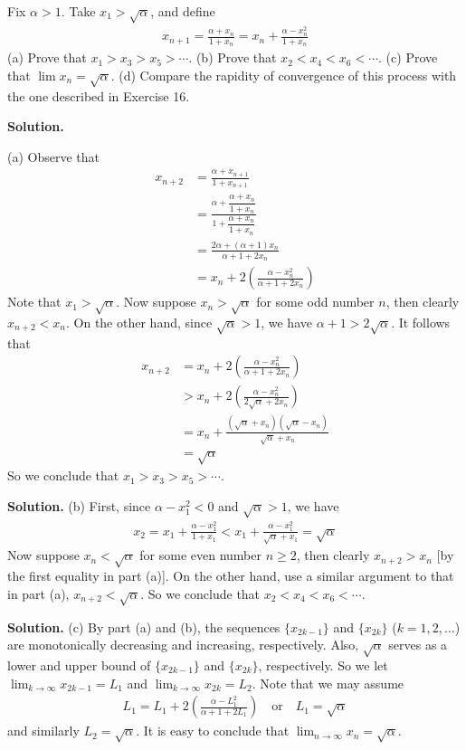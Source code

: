 \documentclass[12pt]{article}
\theoremstyle{definition}
\begin{document}
Fix $\alpha>1$. Take $x_1>\sqrt{\alpha}$, and define
\begin{align*}
x_{n+1}=\frac{\alpha+x_n}{1+x_n}=x_n+\frac{\alpha-x_n^2}{1+x_n}
\end{align*}
(a) Prove that $x_1>x_3>x_5>\cdots$.
(b) Prove that $x_2<x_4<x_6<\cdots$.
(c) Prove that $\lim x_n=\sqrt{\alpha}$.
(d) Compare the rapidity of convergence of this process with the one described in Exercise 16.

\smallskip
\noindent\textbf{Solution.}\quad

(a) Observe that
\begin{align*}
x_{n+2}
&=\frac{\alpha+x_{n+1}}{1+x_{n+1}} \\
&=\frac{\alpha+\dfrac{\alpha+x_n}{1+x_n}}{1+\dfrac{\alpha+x_n}{1+x_n}} \\
&=\frac{2\alpha+(\alpha+1) x_n}{\alpha+1+2x_n} \\
&=x_n+2\left(\frac{\alpha-x_n^2}{\alpha+1+2x_n}\right)
\end{align*}
Note that $x_1>\sqrt{\alpha}$. Now suppose $x_n>\sqrt{\alpha}$ for some odd number $n$, then clearly $x_{n+2}<x_n$. On the other hand, since $\sqrt{\alpha}>1$, we have $\alpha+1>2\sqrt{\alpha}$. It follows that
\begin{align*}
x_{n+2}
&=x_n+2\left(\frac{\alpha-x_n^2}{\alpha+1+2x_n}\right) \\
&>x_n+2\left(\frac{\alpha-x_n^2}{2\sqrt{\alpha}+2x_n}\right) \\
&=x_n+\frac{\left(\sqrt{\alpha}+x_n\right)\left(\sqrt{\alpha}-x_n\right)}{\sqrt{\alpha}+x_n} \\
&=\sqrt{\alpha}
\end{align*}
So we conclude that $x_1>x_3>x_5>\cdots$.

\smallskip
\noindent\textbf{Solution.}\quad
(b) First, since $\alpha-x_1^2<0$ and $\sqrt{\alpha}>1$, we have
\begin{align*}
x_2
=x_1+\frac{\alpha-x_1^2}{1+x_1}
<x_1+\frac{\alpha-x_1^2}{\sqrt{\alpha}+x_1}
=\sqrt{\alpha}
\end{align*}
Now suppose $x_n<\sqrt{\alpha}$ for some even number $n\ge 2$, then clearly $x_{n+2}>x_n$ [by the first equality in part (a)]. On the other hand, use a similar argument to that in part (a), $x_{n+2}<\sqrt{\alpha}$. So we conclude that $x_2<x_4<x_6<\cdots$.

\smallskip
\noindent\textbf{Solution.}\quad
(c) By part (a) and (b), the sequences $\{x_{2k-1}\}$ and $\{x_{2k}\}$ ($k=1,2,\ldots$) are monotonically decreasing and increasing, respectively. Also, $\sqrt{\alpha}$ serves as a lower and upper bound of $\{x_{2k-1}\}$ and $\{x_{2k}\}$, respectively. So we let $\lim_{k\to\infty} x_{2k-1}=L_1$ and $\lim_{k\to\infty} x_{2k}=L_2$. Note that we may assume
\begin{align*}
L_1=L_1+2\left(\frac{\alpha-L_1^2}{\alpha+1+2L_1}\right)\quad\mbox{or}\quad
L_1=\sqrt{\alpha}
\end{align*}
and similarly $L_2=\sqrt{\alpha}$. It is easy to conclude that $\lim_{n\to\infty}x_n=\sqrt{\alpha}$.
\end{document}
